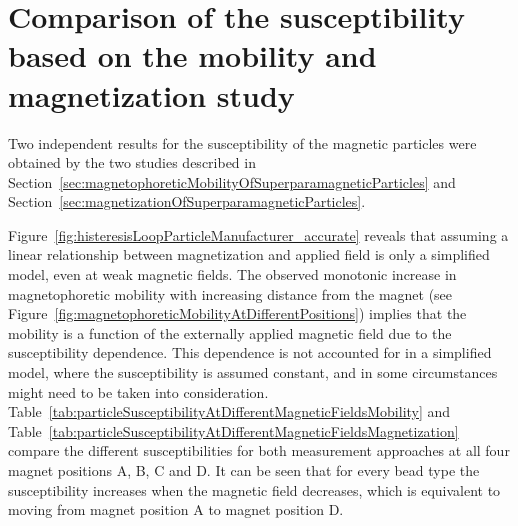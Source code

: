 \section{Comparison of the susceptibility based on the mobility and magnetization study}
\label{sec:comparisonOfSusceptibilityBasedOnMobilityAndMagnetizationStudy}
Two independent results for the susceptibility of the magnetic particles were obtained by the two studies described in Section~\ref{sec:magnetophoreticMobilityOfSuperparamagneticParticles} and Section~\ref{sec:magnetizationOfSuperparamagneticParticles}.

Figure~\ref{fig:histeresisLoopParticleManufacturer_accurate} reveals that assuming a linear relationship between magnetization and applied field is only a simplified model, even at weak magnetic fields. The observed monotonic increase in magnetophoretic mobility with increasing distance from the magnet (see Figure~\ref{fig:magnetophoreticMobilityAtDifferentPositions}) implies that the mobility is a function of the externally applied magnetic field due to the susceptibility dependence. This dependence is not accounted for in a simplified model, where the susceptibility is assumed constant, and in some circumstances might need to be taken into consideration. Table~\ref{tab:particleSusceptibilityAtDifferentMagneticFieldsMobility} and Table~\ref{tab:particleSusceptibilityAtDifferentMagneticFieldsMagnetization} compare the different susceptibilities for both measurement approaches at all four magnet positions A, B, C and D. It can be seen that for every bead type the susceptibility increases when the magnetic field decreases, which is equivalent to moving from magnet position A to magnet position D.
